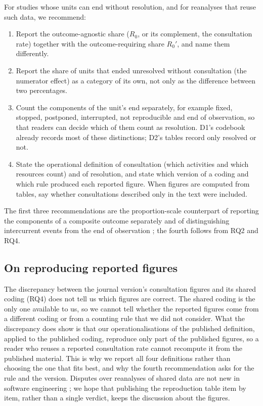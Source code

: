 \documentclass[pdflatex,sn-basic]{sn-jnl}
\newcommand{\Rz}{\ensuremath{R_0}}
\newcommand{\Rzp}{\ensuremath{R_0'}}
\begin{document}
For studies whose units can end without resolution, and for reanalyses that reuse such data, we recommend:

\begin{enumerate}
\item Report the outcome-agnostic share (\Rz, or its complement, the consultation rate) together with the outcome-requiring share \Rzp{}, and name them differently.
\item Report the share of units that ended unresolved without consultation (the numerator effect) as a category of its own, not only as the difference between two percentages.
\item Count the components of the unit's end separately, for example fixed, stopped, postponed, interrupted, not reproducible and end of observation, so that readers can decide which of them count as resolution. D1's codebook already records most of these distinctions; D2's tables record only resolved or not.
\item State the operational definition of consultation (which activities and which resources count) and of resolution, and state which version of a coding and which rule produced each reported figure. When figures are computed from tables, say whether consultations described only in the text were included.
\end{enumerate}

The first three recommendations are the proportion-scale counterpart of reporting the components of a composite outcome separately \citep{ferreiragonzalez2007} and of distinguishing intercurrent events from the end of observation \citep{ich2020e9r1}; the fourth follows from RQ2 and RQ4.

\subsection{On reproducing reported figures}

The discrepancy between the journal version's consultation figures and its shared coding (RQ4) does not tell us which figures are correct. The shared coding is the only one available to us, so we cannot tell whether the reported figures come from a different coding or from a counting rule that we did not consider. What the discrepancy does show is that our operationalisations of the published definition, applied to the published coding, reproduce only part of the published figures, so a reader who reuses a reported consultation rate cannot recompute it from the published material. This is why we report all four definitions rather than choosing the one that fits best, and why the fourth recommendation asks for the rule and the version. Disputes over reanalyses of shared data are not new in software engineering \citep{shepperd2014,tantithamthavorn2016,shepperd2018reply}; we hope that publishing the reproduction table item by item, rather than a single verdict, keeps the discussion about the figures.
\end{document}
